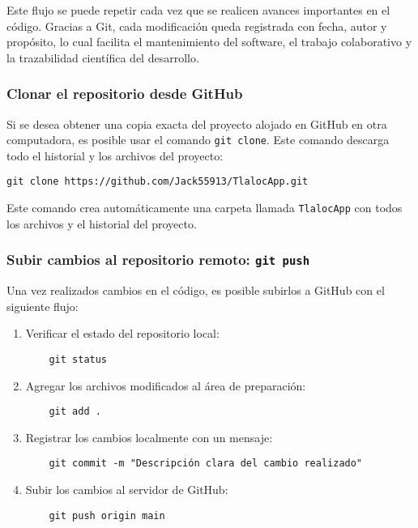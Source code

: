 Este flujo se puede repetir cada vez que se realicen avances importantes en el código. Gracias a Git, cada modificación queda registrada con fecha, autor y propósito, lo cual facilita el mantenimiento del software, el trabajo colaborativo y la trazabilidad científica del desarrollo.

\subsubsection*{Clonar el repositorio desde GitHub}

Si se desea obtener una copia exacta del proyecto alojado en GitHub en otra computadora, es posible usar el comando \texttt{git clone}. Este comando descarga todo el historial y los archivos del proyecto:

\begin{verbatim}
git clone https://github.com/Jack55913/TlalocApp.git
\end{verbatim}

Este comando crea automáticamente una carpeta llamada \texttt{TlalocApp} con todos los archivos y el historial del proyecto.

\subsubsection*{Subir cambios al repositorio remoto: \texttt{git push}}

Una vez realizados cambios en el código, es posible subirlos a GitHub con el siguiente flujo:

\begin{enumerate}
    \item Verificar el estado del repositorio local:
    \begin{verbatim}
    git status
    \end{verbatim}
    
    \item Agregar los archivos modificados al área de preparación:
    \begin{verbatim}
    git add .
    \end{verbatim}
    
    \item Registrar los cambios localmente con un mensaje:
    \begin{verbatim}
    git commit -m "Descripción clara del cambio realizado"
    \end{verbatim}
    
    \item Subir los cambios al servidor de GitHub:
    \begin{verbatim}
    git push origin main
    \end{verbatim}
\end{enumerate}


